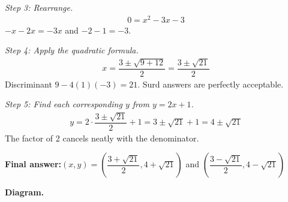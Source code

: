 \documentclass[11pt]{article}
\begin{document}
\textit{Step 3: Rearrange.}
\[\begin{gathered}
0 = x^2 - 3x - 3
\end{gathered}\]
\( -x - 2x = -3x \) and \( -2 - 1 = -3 \).

\textit{Step 4: Apply the quadratic formula.}
\[\begin{gathered}
x = \dfrac{3 \pm \sqrt{9 + 12}}{2} = \dfrac{3 \pm \sqrt{21}}{2}
\end{gathered}\]
Discriminant \( 9 - 4(1)(-3) = 21 \). Surd answers are perfectly acceptable.

\textit{Step 5: Find each corresponding \( y \) from \( y = 2x + 1 \).}
\[\begin{gathered}
y = 2 \cdot \dfrac{3 \pm \sqrt{21}}{2} + 1 = 3 \pm \sqrt{21} + 1 = 4 \pm \sqrt{21}
\end{gathered}\]
The factor of 2 cancels neatly with the denominator.

\begin{answerbox}
\textbf{Final answer:}\quad \(\displaystyle (x, y) = \left(\dfrac{3 + \sqrt{21}}{2}, 4 + \sqrt{21}\right)\) and \(\displaystyle \left(\dfrac{3 - \sqrt{21}}{2}, 4 - \sqrt{21}\right)\)
\end{answerbox}
\textbf{Diagram.}
\end{document}
